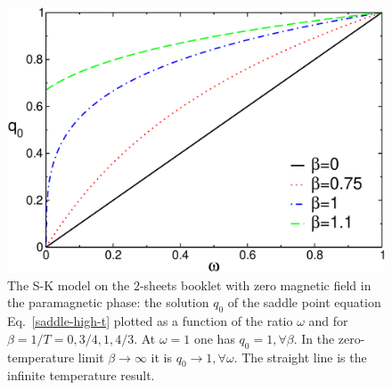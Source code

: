 \documentclass[twocolumn,superscriptaddress,prb,10pt]{revtex4-1}
\begin{document}
\begin{figure}[t]
\includegraphics*[width=0.9\linewidth]{./draft_figs/RSB0_saddle_ht}
\caption{
 The S-K model on the $2$-sheets booklet with zero magnetic field in the 
 paramagnetic phase: the solution $q_0$ of the saddle point equation 
 Eq.~\eqref{saddle-high-t} plotted as a function of the ratio 
 $\omega$ and for $\beta=1/T=0,3/4,1,4/3$. At $\omega=1$ one has 
 $q_0=1,\forall\beta$. In the zero-temperature limit $\beta\to\infty$ 
 it is $q_0\to 1,\forall\omega$. The straight line is the infinite 
 temperature result. 
}
\label{RSB0_saddle_ht}
\end{figure}
\end{document}
